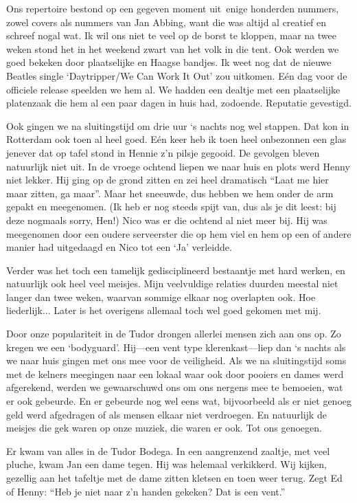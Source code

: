 \documentclass[10pt,twoside, openright]{memoir}
\begin{document}
Ons repertoire bestond op een gegeven moment uit enige honderden nummers, zowel covers als nummers van Jan Abbing, want die was altijd al creatief en schreef nogal wat. Ik wil ons niet te veel op de borst te kloppen, maar na twee weken stond het in het weekend zwart van het volk in die tent. Ook werden we goed bekeken door plaatselijke en Haagse bandjes. Ik weet nog dat de nieuwe Beatles single `Daytripper/We Can Work It Out' zou uitkomen. Eén dag voor de officiele release speelden we hem al. We hadden een dealtje met een plaatselijke platenzaak die hem al een paar dagen in huis had, zodoende. Reputatie gevestigd. 

Ook gingen we na sluitingstijd om drie uur `s nachts nog wel stappen. Dat kon in Rotterdam ook toen al heel goed. Eén keer heb ik toen heel onbezonnen een glas jenever dat op tafel stond in Hennie z'n pilsje gegooid. De gevolgen bleven natuurlijk niet uit. In de vroege ochtend liepen we naar huis en plots werd Henny niet lekker. Hij ging op de grond zitten en zei heel dramatisch ``Laat me hier maar zitten, ga maar''. Maar het sneeuwde, dus hebben we hem onder de arm gepakt en meegenomen. (Ik heb er nog steeds spijt van, dus als je dit leest: bij deze nogmaals sorry, Hen!) Nico was er die ochtend al niet meer bij. Hij was meegenomen door een oudere serveerster die op hem viel en hem op een of andere manier had uitgedaagd en Nico tot een `Ja' verleidde.

Verder was het toch een tamelijk gedisciplineerd bestaantje met hard werken, en natuurlijk ook heel veel meisjes. Mijn veelvuldige relaties duurden meestal niet langer dan twee weken, waarvan sommige elkaar nog overlapten ook. Hoe liederlijk... Later is het overigens allemaal toch wel goed gekomen met mij. 

Door onze populariteit in de Tudor drongen allerlei mensen zich aan ons op. Zo kregen we een `bodyguard'. Hij---een vent type klerenkast---liep dan `s nachts als we naar huis gingen met ons mee voor de veiligheid. Als we na sluitingstijd soms met de kelners meegingen naar een lokaal waar ook door pooiers en dames werd afgerekend, werden we gewaarschuwd ons om ons nergens mee te bemoeien, wat er ook gebeurde. En er gebeurde nog wel eens wat, bijvoorbeeld als er niet genoeg geld werd afgedragen of als mensen elkaar niet verdroegen. En natuurlijk de meisjes die gek waren op onze muziek, die waren er ook. Tot ons genoegen. 

Er kwam van alles in de Tudor Bodega. In een aangrenzend zaaltje, met veel pluche, kwam Jan een dame tegen. Hij was helemaal verkikkerd. Wij kijken, gezellig aan het tafeltje met de dame zitten kletsen en toen weer terug. Zegt Ed of Henny: ``Heb je niet naar z’n handen gekeken? Dat is een vent.'' 
\end{document}
